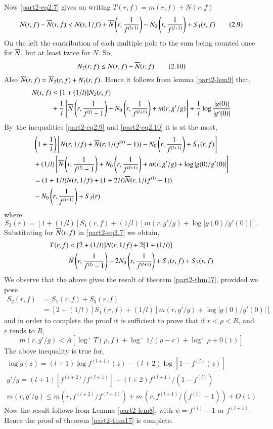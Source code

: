 Now \eqref{part2-eq2.7} gives on writing $T(r,f)=m(r,f)+N(r,f)$
\begin{equation*}
N(r,f)-\overline{N}(r,f)<N(r,1/f)+\overline{N}\left(r,\frac{1}{f^{(l+1)}}\right)-N_{0}\left(r,\frac{1}{f^{(l+1)}}\right)+S_{1}(r,f)\tag{2.9}\label{part2-eq2.9}
\end{equation*}
On the left the contribution of each multiple pole to the sum being
counted once for $\overline{N}$, but at least twice for $N$. So,
\begin{equation*}
N_{2}(r,f)\leq N(r,f)-\overline{N}(r,f)\tag{2.10}\label{part2-eq2.10}
\end{equation*}
Also $\overline{N}(r,f)=\overline{N}_{2}(r,f)+N_{1}(r,f)$. Hence it follows from
lemma \ref{part2-lem9} that,
\begin{align*}
N(r,f)&\leq [1+(1/l)]N_{2}(r,f)\\
&+\frac{1}{l}\left[\overline{N}\left(r,\frac{1}{f^{(l)}-1}\right)
   + N_{0}\left(r,\frac{1}{f^{(l+1)}}\right)+m(r,g'/g)\right]
+ \frac{1}{l}\log\frac{|g(0)|}{|g'(0)|}
\end{align*}
By\pageoriginale\ the inequalities \eqref{part2-eq2.9}
and \eqref{part2-eq2.10} it is at the most,
\begin{align*}
&\left(1+\frac{1}{l}\right)\left[N(r,1/f)+\overline{N}(r,1/(f^{(l)}-1))-N_{0}\left(r,\frac{1}{f^{(l+1)}}\right)+S_{1}(r,f)\right]\\
&
  +(1/l)\left[\overline{N}\left(r,\frac{1}{f^{(l)}-1}\right)+N_{0}\left(r,\frac{1}{f^{(l+1)}}\right)+m(r,g'/g)+\log|g(0)/g'(0)|\right]\\
&=(1+1/l)N(r,1/f)+(1+2/l)\overline{N}(r,1/(f^{(l)}-1))\\
&{}-N_{0}\left(r,\frac{1}{f^{(l+1)}}\right)+S_{3}(r) 
\end{align*}
where
$$
S_{3}(r)=[1+(1/l)]S_{1}(r,f)+(1/l)[m(r,g'/g)+\log|g(0)/g'(0)|].
$$
Substituting for $\overline{N}(r,f)$ in \eqref{part2-eq2.7} we obtain,
\begin{align*}
T(r,f)&<[2+(1/l)]N(r,1/f)+2[1+(1/l)]\\
&\overline{N}\left(r,\frac{1}{f^{(l)}-1}\right) -2N_{0}
\left(r,\frac{1}{f^{(l+1)}} \right)
+S_{1}(r,f)+S_{3}(r,f)
\end{align*}
We observe that the above gives the result of theorem
\ref{part2-thm17}, provided we pose
\begin{align*}
S_{2}(r,f) &= S_{1}(r,f)+S_{3}(r,f)\\
&= [2+(1/l)]S_{1}(r,f)+(1/l)[m(r,g'/g)+\log|g(0)/g'(0)|]
\end{align*}
and in order to complete the proof it is sufficient to prove that if
$r<\rho<R$, and $r$ tends to $R$,
$$
m(r,g'/g)<A[\log^{+}T(\rho,f)+\log^{+}1/(\rho-r)+\log^{+}\rho+0(1)]
$$
The above inequality is true for, 
\begin{gather*}
\log g(z)=(l+1)\log f^{(l+1)}(z)-(l+2)\log [1-f^{(l)}(z)]\\
g'/g=(l+1)\left[f^{(l+2)}/f^{(l+1)}\right]+(l+2)f^{(l+1)}/(1-f^{(l)})\\
m(r,g'/g)\leq m(r,f^{(l+2)}/f^{(l+1)})+m\,
\left(r,f^{(l+1)}/(f^{(l)}-1)\right)+O(1) 
\end{gather*}\pageoriginale
Now the result follows from Lemma \ref{part2-lem8}, with
$\psi=f^{(l)}-1$ or $f^{(l+1)}$. Hence the proof of
theorem \ref{part2-thm17} is complete.

